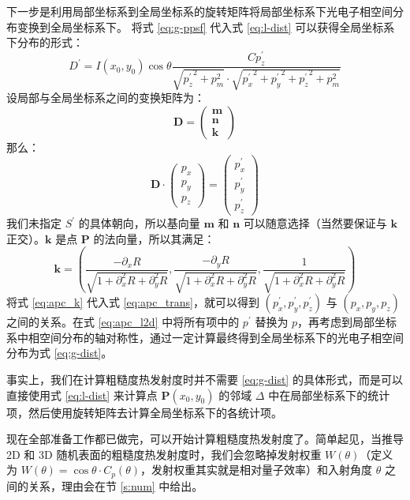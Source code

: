 下一步是利用局部坐标系到全局坐标系的旋转矩阵将局部坐标系下光电子相空间分布变换到全局坐标系下。
将式 \ref{eq:g-ppsf} 代入式 \ref{eq:l-dist} 可以获得全局坐标系下分布的形式：
\begin{equation}
D^{\prime}= I(x_0,y_0)\cos\theta \dfrac{Cp_z^{\prime}}{\sqrt{{p_z^{\prime}}^2+p_m^2}\cdot\sqrt{{p_x^{\prime}}^2+{p_y^{\prime}}^2+{p_z^{\prime}}^2+p_m^2}}
\label{eq:apc_l2d}
\end{equation}
设局部与全局坐标系之间的变换矩阵为：
\begin{equation}
\mathbf{D}=\left(
\begin{array}{c}
\mathbf{m}\\
\mathbf{n}\\
\mathbf{k}
\end{array} \right)
\end{equation}
那么：
\begin{equation}
\mathbf{D}\cdot\left(
\begin{array}{c}
p_x\\
p_y\\
p_z
\end{array} \right)=\left(
\begin{array}{c}
p_x^{\prime}\\
p_y^{\prime}\\
p_z^{\prime}
\end{array} \right)
\label{eq:apc_trans}
\end{equation}
我们未指定 $S^{\prime}$ 的具体朝向，所以基向量 $\bm{m}$ 和 $\bm{n}$ 可以随意选择（当然要保证与 $\bm{k}$ 正交）。$\bm{k}$ 是点 \textbf{P} 的法向量，所以其满足：
\begin{equation}
{\mathbf k} = \left(\dfrac{-\partial_xR}{\sqrt{1+\partial_x^2R+\partial_y^2R}},\dfrac{-\partial_yR}{\sqrt{1+\partial_x^2R+\partial_y^2R}},\dfrac{1}{\sqrt{1+\partial_x^2R+\partial_y^2R}}\right)
\label{eq:apc_k}
\end{equation}
将式 \ref{eq:apc_k} 代入式 \ref{eq:apc_trans}，就可以得到 $(p_x^{\prime}, p_y^{\prime}, p_z^{\prime})$ 与 $(p_x, p_y, p_z)$ 之间的关系。在式 \ref{eq:apc_l2d} 中将所有项中的 $p^{\prime}$ 替换为 $p$，再考虑到局部坐标系中相空间分布的轴对称性，通过一定计算最终得到全局坐标系下的光电子相空间分布为式 \ref{eq:g-dist}。

事实上，我们在计算粗糙度热发射度时并不需要 \ref{eq:g-dist} 的具体形式，而是可以直接使用式 \ref{eq:l-dist} 来计算点 \textbf{P}$(x_0, y_0)$ 的邻域 $\Delta$ 中在局部坐标系下的统计项，然后使用旋转矩阵去计算全局坐标系下的各统计项。

现在全部准备工作都已做完，可以开始计算粗糙度热发射度了。简单起见，当推导 2D 和 3D 随机表面的粗糙度热发射度时，我们会忽略掉发射权重 $W(\theta)$（定义为 $W(\theta)=\cos\theta\cdot C_p(\theta)$，发射权重其实就是相对量子效率）和入射角度 $\theta$ 之间的关系，理由会在节 \ref{s:num} 中给出。

